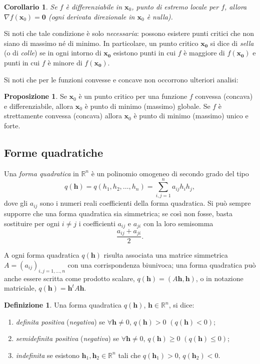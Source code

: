 \documentclass[a4paper]{book}
\numberwithin{equation}{section}
\theoremstyle{plain}
\newtheorem{cor}{Corollario}[section]
\theoremstyle{definition}
\newtheorem{defn}{Definizione}[section]
\newtheorem{prop}{Proposizione}[section]
\theoremstyle{remark}
\renewcommand{\vec}{\boldsymbol}
\theoremstyle{example}
\begin{document}
	\begin{cor}
		Se $f$ è differenziabile in $\vec{x}_0$, punto di estremo locale per $f$, allora $\nabla f(\vec{x}_0) = \vec{0}$ (ogni derivata direzionale in $\vec{x}_0$ è nulla).
	\end{cor}

	Si noti che tale condizione è solo \emph{necessaria}: possono esistere punti critici che non siano di massimo né di minimo. In particolare, un punto critico $\vec{x_0}$ si dice di \emph{sella} (o di \emph{colle}) se in ogni intorno di $\vec{x_0}$ esistono punti in cui $f$ è maggiore di $f(\vec{x_0})$ e punti in cui $f$ è minore di $f(\vec{x_0})$.

	Si noti che per le funzioni convesse e concave non occorrono ulteriori analisi:
	\begin{prop}
		Se $\vec{x}_0$ è un punto critico per una funzione $f$ convessa (concava) e differenziabile, allora $\vec{x}_0$ è punto di minimo (massimo) globale. Se $f$ è strettamente convessa (concava) allora $\vec{x}_0$ è punto di minimo (massimo) unico e forte.
	\end{prop}

	\subsection{Forme quadratiche}
	\label{subsec:formequadratiche}
	Una \emph{forma quadratica} in $\mathbb{R}^n$ è un polinomio omogeneo di secondo grado del tipo
	\begin{equation}
		\label{eqn:formaquadratica}
		q(\vec{h}) = q(h_1, h_2, \dots, h_n) = \sum_{i,j=1}^na_{ij}h_ih_j,
	\end{equation}
	dove gli $a_{ij}$ sono i numeri reali coefficienti della forma quadratica. Si può sempre supporre che una forma quadratica sia simmetrica; se così non fosse, basta sostituire per ogni $i \ne j$ i coefficienti $a_{ij}$ e $a_{ji}$ con la loro semisomma
	\begin{equation*}
		\frac{a_{ij} + a_{ji}}{2}.
	\end{equation*}

	A ogni forma quadratica $q(\vec{h})$ risulta associata una matrice simmetrica $A = (a_{ij})_{i,j = 1, \dots, n}$ con una corrispondenza biunivoca; una forma quadratica può anche essere scritta come prodotto scalare, $q(\vec{h}) = (A\vec{h}, \vec{h})$, o in notazione matriciale, $q(\vec{h}) = \vec{h}^tA\vec{h}$.

	\begin{defn}
		Una forma quadratica $q(\vec{h})$, $\vec{h} \in \mathbb{R}^n$, si dice:
		\begin{enumerate}
			\item \emph{definita positiva} (\emph{negativa}) se $\forall \vec{h} \ne 0$, $q(\vec{h}) > 0$ $(q(\vec{h}) < 0)$;
			\item \emph{semidefinita positiva} (\emph{negativa}) se $\forall \vec{h} \ne 0$, $q(\vec{h}) \ge 0$ $(q(\vec{h}) \le 0)$;
			\item \emph{indefinita} se esistono $\vec{h}_1, \vec{h}_2 \in \mathbb{R}^n$ tali che $q(\vec{h}_1) > 0$, $q(\vec{h}_2) < 0$.
		\end{enumerate}
	\end{defn}
\end{document}
